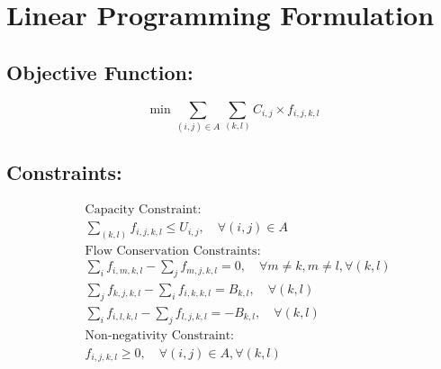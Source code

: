 \documentclass{article}
\begin{document}
\section*{Linear Programming Formulation}

\subsection*{Objective Function:}
\[
\min \sum_{(i,j) \in A} \sum_{(k,l)} C_{i,j} \times f_{i,j,k,l}
\]

\subsection*{Constraints:}
\begin{align*}
& \text{Capacity Constraint:} \\
& \sum_{(k,l)} f_{i,j,k,l} \leq U_{i,j}, \quad \forall (i,j) \in A \\

& \text{Flow Conservation Constraints:} \\
& \sum_{i} f_{i,m,k,l} - \sum_{j} f_{m,j,k,l} = 0, \quad \forall m \neq k, m \neq l, \forall (k,l) \\
& \sum_{j} f_{k,j,k,l} - \sum_{i} f_{i,k,k,l} = B_{k,l}, \quad \forall (k,l) \\
& \sum_{i} f_{i,l,k,l} - \sum_{j} f_{l,j,k,l} = -B_{k,l}, \quad \forall (k,l) \\

& \text{Non-negativity Constraint:} \\
& f_{i,j,k,l} \geq 0, \quad \forall (i,j) \in A, \forall (k,l)
\end{align*}
\end{document}
